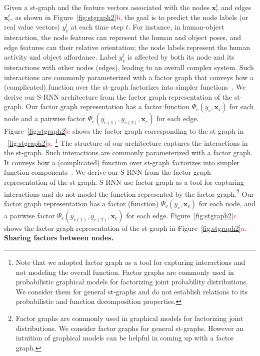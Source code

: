 \documentclass[10pt,twocolumn,letterpaper]{article}
\newcommand{\ve}[1]{\mathbf{#1}}
\newcommand{\rc}[1]{\textcolor{red}{#1}}
\begin{document}
Given a st-graph and the feature vectors associated with the nodes $\ve{x}_v^t$ and edges $\ve{x}_e^t$, as shown in Figure~\ref{fig:stgraph2}\rc{b}, the goal is to predict the node labels (or real value vectors) $y_v^t$ at each time step $t$. For instance, in human-object interaction, the node features can represent the human and object poses, and edge features can their relative orientation; the node labels represent the human activity and object affordance. 
Label $y_v^t$ is affected by both its node and its interactions with other nodes (edges), leading to an overall complex system.
Such interactions  are commonly parameterized with a factor graph that conveys how a (complicated) function over the st-graph factorizes into simpler functions~\cite{Kschischang01}.
We derive our S-RNN architecture from the factor graph representation of the st-graph. Our factor graph representation has a factor function $\Psi_v(y_v,\ve{x}_v)$ for each node and a pairwise factor $\Psi_e(y_{e(1)},y_{e(2)},\ve{x}_e)$ for each edge. Figure~\ref{fig:stgraph2}\rc{c} shows the factor graph corresponding to the st-graph in ~\ref{fig:stgraph2}\rc{a}. \footnote{Note that we adopted factor graph as a tool for capturing interactions and not modeling the overall function. Factor graphs are commonly used in probabilistic graphical models for factorizing joint probability distributions. We consider them for general st-graphs and do not establish relations to its probabilistic and function decomposition properties.}%
The structure of our architecture captures the interactions in the st-graph. Such interactions  are commonly parameterized with a factor graph. It conveys how a (complicated) function over st-graph factorizes into simpler function components~\cite{Kschischang01}.  We derive our S-RNN from the factor graph representation of the st-graph. S-RNN use factor graph as a tool for capturing interactions and do not model the function represented by the factor graph.\footnote{Factor graphs are commonly used in graphical models for factorizing joint distributions. We consider factor graphs for general st-graphs. However an intuition of graphical models can be helpful in coming up with a factor graph.} Our factor graph representation has a factor (function) $\Psi_v(y_v,\ve{x}_v)$ for each node, and a pairwise factor  $\Psi_e(y_{e(1)},y_{e(2)},\ve{x}_e)$ for each edge. Figure~\ref{fig:stgraph2}\rc{c} shows the factor graph representation of the st-graph in Figure~\ref{fig:stgraph2}\rc{a}.
\fi\textbf{Sharing factors between nodes.}
\end{document}
